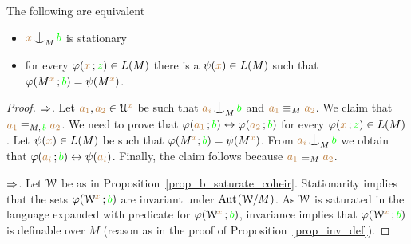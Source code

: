 \begin{proposition}\label{prop_stationarity}
  The following are equivalent 
  \begin{itemize}
    \item [1.] ${\mr x}\nonfork_M{\gr b}$ is stationary 
    \item [2.] for every $\varphi({\color{brown} x}\,;{\color{green} z})\in L(M)$ there is a $\psi({\color{brown} x})\in L(M)$ such that $\varphi(M^{\color{brown} x}\,;{\color{green} b})=\psi(M^{\color{brown} x})$.\smallskip
  \end{itemize}
\end{proposition}

\begin{proof}
  $\Rightarrow$.
  Let ${\color{brown} a_1},{\color{brown} a_2}\in\EuScript U^{\color{brown} x}$ be such that ${\mr a_i}\nonfork_M{\gr b}$ and ${\color{brown} a_1}\equiv_M{\color{brown} a_2}$.
  We claim that ${\color{brown} a_1}\equiv_{M,\,{\color{green} b}}{\color{brown} a_2}$.
  We need to prove that $\varphi({\color{brown} a_1}\,;{\color{green} b})\leftrightarrow\varphi({\color{brown} a_2}\,;{\color{green} b})$ for every  $\varphi({\color{brown} x}\,;{\color{green} z})\in L(M)$.
  Let $\psi({\color{brown} x})\in L(M)$ be such that $\varphi(M^{\color{brown} x};{\color{green} b})=\psi(M^{\color{brown} x})$.
  From ${\mr a_i}\nonfork_M{\gr b}$ we obtain that  $\varphi({\color{brown} a_i}\,;{\color{green} b})\leftrightarrow\psi({\color{brown} a_i})$.
  Finally, the claim follows because ${\color{brown} a_1}\equiv_M{\color{brown} a_2}$.

  $\Rightarrow$.
  Let $\EuScript W$ be as in Proposition~\ref{prop_b_saturate_coheir}. 
  Stationarity implies that the sets $\varphi(\EuScript W^{\color{brown} x}\,;{\color{green} b})$ are invariant under ${\rm Aut\kern.15ex}(\EuScript W/M)$.
  As $\EuScript W$ is saturated in the language expanded with predicate for $\varphi(\EuScript W^{\color{brown} x}\,;{\color{green} b})$, invariance implies that $\varphi(\EuScript W^{\color{brown} x}\,;{\color{green} b})$ is definable over $M$ (reason as in the proof of Proposition~\ref{prop_inv_def}).
\end{proof}



% 

